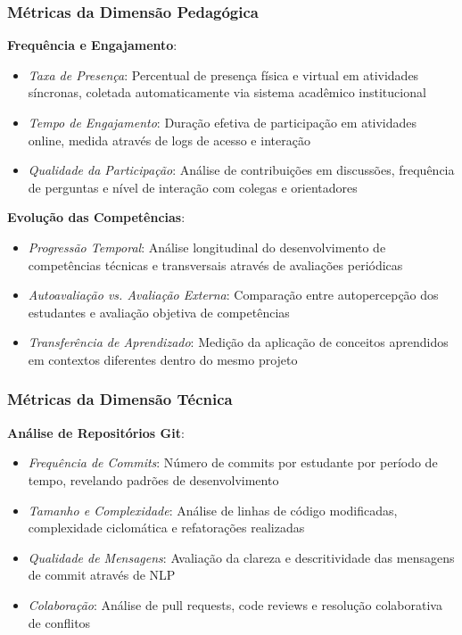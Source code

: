 \documentclass[12pt,a4paper]{article}
\begin{document}
\subsubsection{Métricas da Dimensão Pedagógica}

\textbf{Frequência e Engajamento}:
\begin{itemize}
  \item \textit{Taxa de Presença}: Percentual de presença física e virtual em atividades síncronas, coletada automaticamente via sistema acadêmico institucional
  \item \textit{Tempo de Engajamento}: Duração efetiva de participação em atividades online, medida através de logs de acesso e interação
  \item \textit{Qualidade da Participação}: Análise de contribuições em discussões, frequência de perguntas e nível de interação com colegas e orientadores
\end{itemize}

\textbf{Evolução das Competências}:
\begin{itemize}
  \item \textit{Progressão Temporal}: Análise longitudinal do desenvolvimento de competências técnicas e transversais através de avaliações periódicas
  \item \textit{Autoavaliação vs. Avaliação Externa}: Comparação entre autopercepção dos estudantes e avaliação objetiva de competências
  \item \textit{Transferência de Aprendizado}: Medição da aplicação de conceitos aprendidos em contextos diferentes dentro do mesmo projeto
\end{itemize}

\subsubsection{Métricas da Dimensão Técnica}

\textbf{Análise de Repositórios Git}:
\begin{itemize}
  \item \textit{Frequência de Commits}: Número de commits por estudante por período de tempo, revelando padrões de desenvolvimento
  \item \textit{Tamanho e Complexidade}: Análise de linhas de código modificadas, complexidade ciclomática e refatorações realizadas
  \item \textit{Qualidade de Mensagens}: Avaliação da clareza e descritividade das mensagens de commit através de NLP
  \item \textit{Colaboração}: Análise de pull requests, code reviews e resolução colaborativa de conflitos
\end{itemize}
\end{document}
